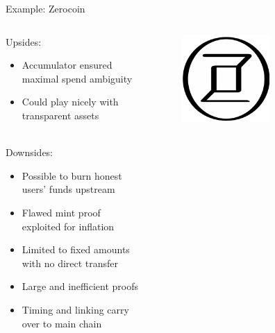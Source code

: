 \documentclass[aspectratio=169]{beamer}
\begin{document}
\begin{frame}{Example: Zerocoin}
\begin{columns}
\begin{column}{0.7\textwidth}
Upsides:
\begin{itemize}
\item Accumulator ensured maximal spend ambiguity
\item Could play nicely with transparent assets \\~\\
\end{itemize}

Downsides:
\begin{itemize}
\item Possible to burn honest users' funds upstream
\item Flawed mint proof exploited for inflation
\item Limited to fixed amounts with no direct transfer
\item Large and inefficient proofs
\item Timing and linking carry over to main chain
\end{itemize}
\end{column}
\begin{column}{0.3\textwidth}
\begin{figure}
\includegraphics[width=0.6\textwidth]{zerocoin.png}
\end{figure}
\end{column}
\end{columns}
\end{frame}
\end{document}
